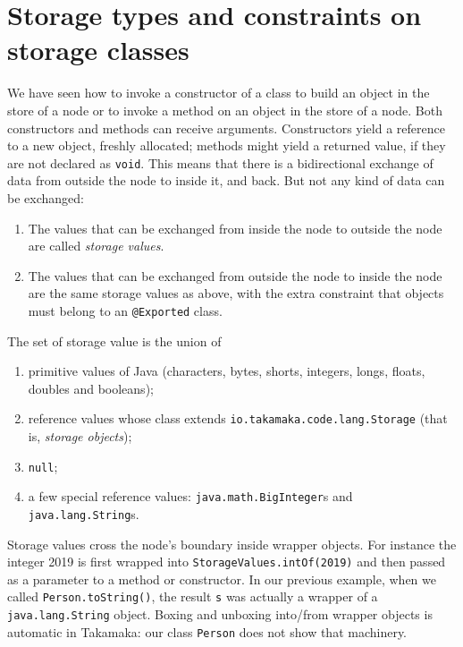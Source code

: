 \section{Storage types and constraints on storage classes}\label{sec:storage_types_and_classes}

We have seen how to invoke a constructor of a class to build an object in
the store of a node or to invoke a method on an object in the store of a node.
Both constructors and
methods can receive arguments. Constructors yield a reference to a new
object, freshly allocated; methods might yield a returned value, if they are
not declared as \texttt{void}. This means that there is a bidirectional
exchange of data from outside the node to inside it, and back. But not any
kind of data can be exchanged:
%
\begin{enumerate}
\item The values that can be exchanged from inside the node to
  outside the node are called \emph{storage values}.
\item The values that can be exchanged from outside the node to
  inside the node are the same storage values as above, with the extra constraint
  that objects must belong to an \texttt{@Exported} class.
\end{enumerate}

The set of storage value is the union of
%
\begin{enumerate}
\item primitive values of Java (characters, bytes, shorts, integers, longs, floats,
  doubles and booleans);
\item reference values whose class extends \texttt{io.takamaka.code.lang.Storage}
  (that is, \emph{storage objects});
\item \texttt{null};
\item a few special reference values: \texttt{java.math.BigInteger}s and
  \texttt{java.lang.String}s.
\end{enumerate}

Storage values cross the
node's boundary inside wrapper objects. For instance the integer 2019
is first wrapped into \texttt{StorageValues.intOf(2019)} and then passed
as a parameter to a method or constructor. In our previous example,
when we called \texttt{Person.toString()}, the result \texttt{s} was actually a wrapper
of a \texttt{java.lang.String} object. Boxing and unboxing into/from wrapper objects
is automatic in Takamaka: our class \texttt{Person} does not show that machinery.

